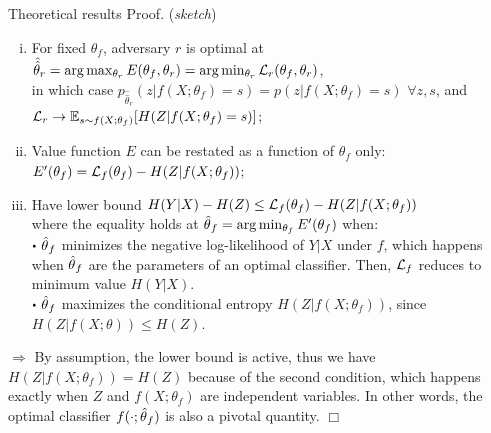 \documentclass[final]{beamer}
\newcommand{\qedwhite}{\hfill \ensuremath{\Box}}
\newcommand\sbullet[1][.5]{\mathbin{\vcenter{\hbox{\scalebox{#1}{$\bullet$}}}}}
\begin{document}
\begin{frame}{}
\begin{textblock}{0.32}
\begin{block}{Theoretical results \phantom{p}}
Proof. (\textit{sketch})\\
\begin{enumerate}[(i)]
\item For fixed $\theta_f$, adversary $r$ is optimal at $\hat{\hat\theta}_r = \arg \max_{\theta_r} E(\theta_f, \theta_r)  = \arg \min_{\theta_r} {\cal L}_r(\theta_f, \theta_r)$,\\
in which case $p_{\hat{\hat\theta}_r}(z|f(X;\theta_f)=s) = p(z|f(X;\theta_f)=s)$ $\forall z, s$, and\\
${\cal L}_r \to \mathbb{E}_{s \sim f(X;\theta_f)} [ H({Z|f(X;\theta_f)=s}) ]$;

\item Value function $E$ can be restated as a function of $\theta_f$ only: \\
$E'(\theta_f) = {\cal L}_f(\theta_f) -  H({Z|f(X;\theta_f)})$; 

\item Have lower bound $H({Y|X}) - H(Z) \leq {\cal L}_f(\theta_f) - H({Z|f(X;\theta_f)})$ \\
where the equality holds at $\smash{\hat\theta}_f = \arg \min_{\theta_f} E'(\theta_f)$ when: \\
 $\sbullet$ $\smash{\hat\theta}_f$ minimizes the negative log-likelihood of $Y|X$ under $f$,
    which happens when $\smash{\hat\theta}_f$ are the parameters
    of an optimal classifier. Then, ${\cal L}_f$ reduces to 
    minimum value $H({Y|X})$. \\
  $\sbullet$ $\smash{\hat\theta}_f$ maximizes the conditional entropy
    $H({Z|f(X;\theta_f)})$, since $H(Z|f(X;\theta)) \leq H(Z)$.
\end{enumerate}


$\Rightarrow$ By assumption, the lower bound is active, thus we have $H(Z|f(X;\theta_f)) = H(Z)$
because of the second condition, which happens exactly when $Z$ and $f(X;\theta_f)$
are independent variables. In other words,  the
optimal classifier $f(\cdot;\smash{\hat\theta}_f)$ is also a pivotal
quantity. \qedwhite

\end{block}


\end{textblock}
\end{frame}
\end{document}
